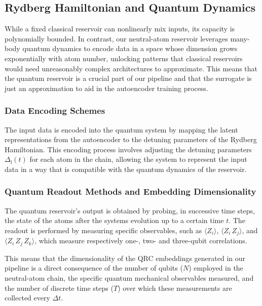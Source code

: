 \documentclass[conference]{IEEEtran}
\begin{document}
\subsection{Rydberg Hamiltonian and Quantum Dynamics}
While a fixed classical reservoir can nonlinearly mix inputs, its capacity is polynomially bounded. In contrast, our neutral-atom reservoir leverages many-body quantum dynamics to encode data in a space whose dimension grows exponentially with atom number, unlocking patterns that classical reservoirs would need unreasonably complex architectures to approximate. This means that the quantum reservoir is a crucial part of our pipeline and that the surrogate is just an approximation to aid in the autoencoder training process.



\subsubsection{Data Encoding Schemes}
The input data is encoded into the quantum system by mapping
the latent representations from the autoencoder to the
detuning parameters of the Rydberg Hamiltonian.
This encoding process involves adjusting the detuning
parameters \( \Delta_{\mathrm{l}}(t) \) for each atom in the chain,
allowing the system to represent the input data in a way that
is compatible with the quantum dynamics of the reservoir.

\subsubsection{Quantum Readout Methods and Embedding Dimensionality}
The quantum reservoir's output is obtained by probing, 
in successive time steps, the state of the atoms 
after the systems evolution up to a certain time \( t \).
The readout is performed by measuring specific observables,
such as $\langle Z_i \rangle$, $\langle Z_i \, Z_j\rangle$, and $\langle Z_i \, Z_j \, Z_k \rangle$, which measure respectively one-, two- and three-qubit correlations. 

This means that the dimensionality of the QRC embeddings generated in our pipeline is a direct consequence of the number of qubits ($N$) employed in the neutral-atom chain, the specific quantum mechanical observables measured, and the number of discrete time steps ($T$) over which these measurements are collected every \(\Delta t\).
\end{document}
